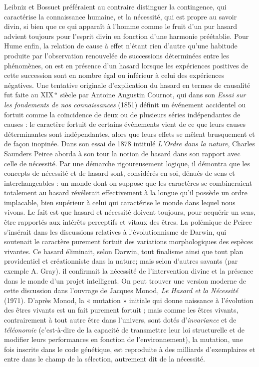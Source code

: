 Leibniz et Bossuet préféraient au
contraire distinguer la contingence, qui
caractérise la connaissance humaine, et la
nécessité, qui est propre au savoir divin, si
bien que ce qui apparaît à l’homme
comme le fruit d’un pur hasard advient
toujours pour l'esprit divin en fonction
d’une harmonie préétablie. Pour Hume
enfin, la relation de cause à effet n’étant
rien d’autre qu’une habitude produite par
l'observation renouvelée de successions
déterminées entre les phénomènes, on est
en présence d’un hasard lorsque les expériences positives de cette succession sont
en nombre égal ou inférieur à celui des
expériences négatives.
Une tentative originale d’explication du
hasard en termes de causalité fut faite au
{\footnotesize XIX}$^\text{\,e}$ siècle par Antoine Augustin Cournot, qui
dans son {\it Essai sur les fondements de nos
connaissances} (1851) définit un événement accidentel ou fortuit comme la coïncidence de deux ou de plusieurs séries
indépendantes de causes : le caractère fortuit de certains événements vient de ce
que leurs causes déterminantes sont indépendantes, alors que leurs effets se mêlent
brusquement et de façon inopinée. Dans
son essai de 1878 intitulé {\it L'Ordre dans la
nature}, Charles Saunders Peirce aborda à
son tour la notion de hasard dans son rapport avec celle de nécessité. Par une
démarche rigoureusement logique, il
démontra que les concepts de nécessité et
de hasard sont, considérés en soi, dénués
de sens et interchangeables : un monde
dont on suppose que les caractères se
combineraient totalement au hasard révélerait effectivement à la longue qu'il possède un ordre implacable, bien supérieur
à celui qui caractérise le monde dans
lequel nous vivons. Le fait est que hasard
et nécessité doivent toujours, pour acquérir un sens, être rapportés aux intérêts
perceptifs et vitaux des êtres. La polémique de Peirce s’insérait dans les discussions relatives à l’évolutionnisme de
Darwin, qui soutenait le caractère purement fortuit des variations morphologiques des espèces vivantes. Ce hasard
éliminait, selon Darwin, tout finalisme
ainsi que tout plan providentiel et créationniste dans la nature; mais selon
d’autres savants (par exemple A. Gray).
il confirmait la nécessité de l’intervention
divine et la présence dans le monde d’un
projet intelligent. On peut trouver une
version moderne de cette discussion dans
l'ouvrage de Jacques Monod, {\it Le Hasard
et la Nécessité} (1971). D’après Monod, la
« mutation » initiale qui donne naissance
à l’évolution des êtres vivants est un fait
purement fortuit ; mais comme les êtres
vivants, contrairement à tout autre être
dans l’univers, sont dotés d’{\it invariance} et
de {\it téléonomie} (c’est-à-dire de la capacité
de transmettre leur loi structurelle et de
modifier leurs performances en fonction
de l’environnement), la mutation, une fois
inscrite dans le code génétique, est reproduite à des milliards d'exemplaires et
entre dans le champ de la sélection, autrement dit de la nécessité.


